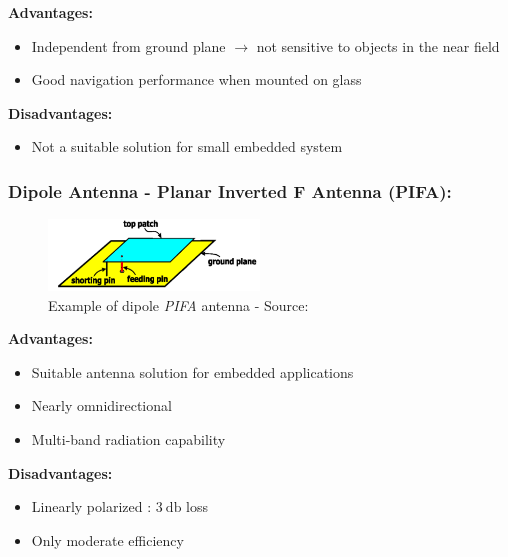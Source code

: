 \documentclass[report.tex]{subfiles}
\begin{document}
\begin{flushleft}
\textbf{Advantages:}
\end{flushleft}
\begin{itemize}
\item Independent from ground plane $\rightarrow$ not sensitive to objects in the near field
\item  Good navigation performance when mounted on glass 
\end{itemize}

\begin{flushleft}
\textbf{Disadvantages:}
\end{flushleft}
\begin{itemize}
\item Not a suitable solution for small embedded system
\end{itemize}

\subsubsection{Dipole Antenna - Planar Inverted F Antenna (PIFA):}

\begin{figure}[H]
	\centering
	\includegraphics[width=0.5\textwidth]{Include/Figure/antenna/pifa_antenna.png}
	\caption{Example of dipole \textit{PIFA} antenna - Source:\cite{gnss_ant_intro}}
	\label{fig:pifa_antenna}
\end{figure}

\pagebreak

\begin{flushleft}
\textbf{Advantages:}
\end{flushleft}
\begin{itemize}
\item Suitable antenna solution for embedded applications
\item Nearly omnidirectional 
\item Multi-band radiation capability
\end{itemize}

\begin{flushleft}
\textbf{Disadvantages:}
\end{flushleft}
\begin{itemize}
\item Linearly polarized : $\SI{3}{\decibel}$ loss
\item Only moderate efficiency
\end{itemize}
\end{document}
